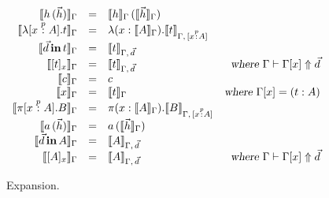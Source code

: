 \begin{figure}
\begin{center}
\begin{math}
\begin{array}{rclr}

\llbracket h\,(\vec{h}) \rrbracket_{\Gamma}
&=& 
\llbracket h \rrbracket_{\Gamma}\,(\llbracket \vec{h} \rrbracket_{\Gamma}) 
\\
\llbracket \lambda [x \stackrel{p}{:} A]. t \rrbracket_{\Gamma}
&=&
\lambda (x : \llbracket A \rrbracket_{\Gamma}). \llbracket t \rrbracket_{\Gamma,\, [x \stackrel{p}{:} A]}
\\
\llbracket \vec{d} \,\textbf{in}\, t \rrbracket_{\Gamma}
&=&
\llbracket t \rrbracket_{\Gamma,\, \vec{d}}
\\
\llbracket [ t ]_{x} \rrbracket_{\Gamma}
&=&
\llbracket t \rrbracket_{\Gamma,\, \vec{d}}
&\textsl{where } \Gamma \vdash \Gamma[x] \Uparrow \vec{d}
\\
\llbracket c \rrbracket_{\Gamma} 
&=&
c
\\
\llbracket x \rrbracket_{\Gamma} 
&=&
\llbracket t \rrbracket_{\Gamma}
& \textsl{where } \Gamma[x] = (t : A)
\\
\llbracket \pi [x \stackrel{p}{:} A]. B \rrbracket_{\Gamma}
&=&
\pi (x : \llbracket A \rrbracket_{\Gamma}). \llbracket B \rrbracket_{\Gamma,\, [x \stackrel{p}{:} A]}
\\
\llbracket a\,(\vec{h}) \rrbracket_{\Gamma}
&=&
a\,(\llbracket \vec{h} \rrbracket_{\Gamma}) 
\\
\llbracket \vec{d} \,\textbf{in}\, A \rrbracket_{\Gamma}
&=&
\llbracket A \rrbracket_{\Gamma,\, \vec{d}}
\\
\llbracket [ A ]_{x} \rrbracket_{\Gamma}
&=&
\llbracket A \rrbracket_{\Gamma,\, \vec{d}}
&\textsl{where } \Gamma \vdash \Gamma[x] \Uparrow \vec{d}
\\
\end{array}
\end{math}
\end{center}
\caption{Expansion.}
\label{fig:expansion}
\end{figure}
